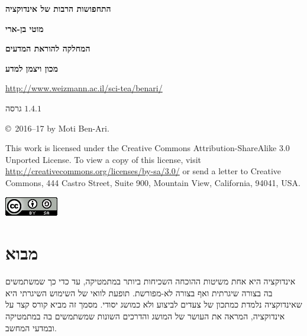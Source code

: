 
\thispagestyle{empty}

\begin{center}
\textbf{\LARGE התחפושות הרבות של אינדוקציה}

\bigskip
\bigskip

\textbf{\Large מוטי בן-ארי}

\bigskip

\textbf{\large המחלקה להוראת המדעים}

\smallskip

\textbf{\large מכון ויצמן למדע}

\bigskip

\url{http://www.weizmann.ac.il/sci-tea/benari/}

\bigskip

\large{גרסה
$1.4.1$}
\end{center}

\bigskip

\begin{center}
\copyright{}\  2016--17 by Moti Ben-Ari.
\end{center}

This work is licensed under the Creative Commons Attribution-ShareAlike 3.0 Unported License. To view a copy of this license, visit \url{http://creativecommons.org/licenses/by-sa/3.0/} or send a letter to Creative Commons, 444 Castro Street, Suite 900, Mountain View, California, 94041, USA.

\begin{center}
\includegraphics[width=.2\textwidth]{../../by-sa.png}
\end{center}


\setcounter{tocdepth}{0}
\tableofcontents


\chapter[מבוא]{\vspace*{-2ex}מבוא}\label{s.intro}

\vspace*{-4ex}

אינדוקציה היא אחת משיטות ההוכחה השכיחות ביותר במתמטיקה, עד כדי כך שמשתמשים בה בצורה שיגרתית ואף בצורה לא-מפורשת. תופעת לוואי של השימוש השיגרתי היא שאינדוקציה נלמדת כמתכון של צעדים לביצוע ולא כמושג יסודי. מסמך זה מביא קורס קצר על אינדוקציה, המראה את העושר של המושג והדרכים השונות שמשתמשים בה במתמטיקה ובמדעי המחשב.

